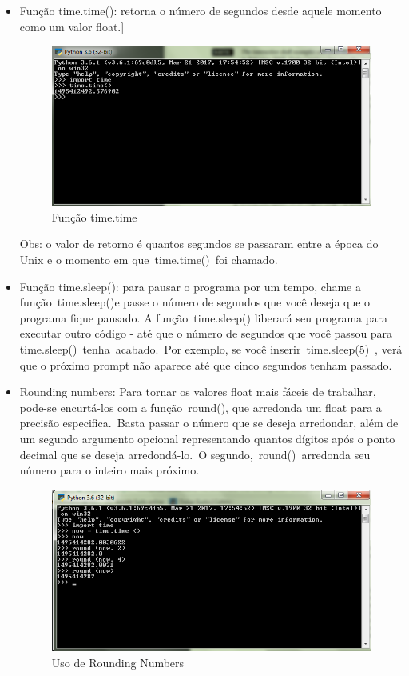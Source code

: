\documentclass[12pt, a4paper, twocolumn]{article}
\begin{document}
\begin{itemize}
	\item Função time.time(): retorna o número de segundos desde aquele momento como um valor float.]
	\begin{figure}[htb!]
		\centering
		\includegraphics[scale = 0.45]{timetime.png}
		\caption{Função time.time}
	\end{figure}
	
	Obs: o valor de retorno é quantos segundos se passaram entre a época do Unix e o momento em que time.time() foi chamado.
	\item Função time.sleep(): para pausar o programa por um tempo, chame a função time.sleep()e passe o número de segundos que você deseja que o programa fique pausado. A função time.sleep() liberará seu programa para executar outro código - até que o número de segundos que você passou para time.sleep() tenha acabado. Por exemplo, se você inserir time.sleep(5) , verá que o próximo prompt não aparece até que cinco segundos tenham passado.
	\item Rounding numbers: Para tornar os valores float mais fáceis de trabalhar, pode-se encurtá-los com a função round(), que arredonda um float para a precisão especifica. Basta passar o número que se deseja arredondar, além de um segundo argumento opcional representando quantos dígitos após o ponto decimal que se deseja arredondá-lo. O segundo, round() arredonda seu número para o inteiro mais próximo.
	\begin{figure}[htb!]
		\centering
		\includegraphics[scale = 0.45]{round.png}
		\caption{Uso de Rounding Numbers}
	\end{figure}
\end{itemize}
\end{document}

